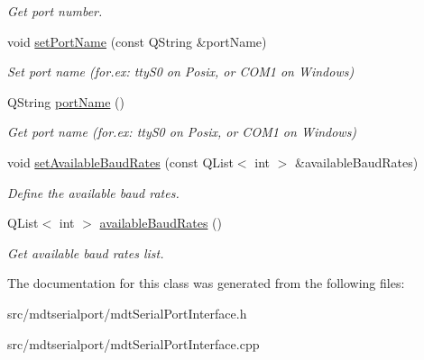 \begin{DoxyCompactItemize}
\begin{DoxyCompactList}\small\item\em Get port number. \end{DoxyCompactList}\item 
\hypertarget{classmdt_serial_port_interface_a09153f63415acdccceac1c212486b92e}{
void \hyperlink{classmdt_serial_port_interface_a09153f63415acdccceac1c212486b92e}{setPortName} (const QString \&portName)}
\label{classmdt_serial_port_interface_a09153f63415acdccceac1c212486b92e}

\begin{DoxyCompactList}\small\item\em Set port name (for.ex: ttyS0 on Posix, or COM1 on Windows) \end{DoxyCompactList}\item 
\hypertarget{classmdt_serial_port_interface_ab09ac4bac0de767291fdbdc6c3ff0ca8}{
QString \hyperlink{classmdt_serial_port_interface_ab09ac4bac0de767291fdbdc6c3ff0ca8}{portName} ()}
\label{classmdt_serial_port_interface_ab09ac4bac0de767291fdbdc6c3ff0ca8}

\begin{DoxyCompactList}\small\item\em Get port name (for.ex: ttyS0 on Posix, or COM1 on Windows) \end{DoxyCompactList}\item 
\hypertarget{classmdt_serial_port_interface_a6ca559d02fe871ec354e6ef6af2a6e03}{
void \hyperlink{classmdt_serial_port_interface_a6ca559d02fe871ec354e6ef6af2a6e03}{setAvailableBaudRates} (const QList$<$ int $>$ \&availableBaudRates)}
\label{classmdt_serial_port_interface_a6ca559d02fe871ec354e6ef6af2a6e03}

\begin{DoxyCompactList}\small\item\em Define the available baud rates. \end{DoxyCompactList}\item 
\hypertarget{classmdt_serial_port_interface_ab4f93655abb9aaa12e24bb6db6c99d96}{
QList$<$ int $>$ \hyperlink{classmdt_serial_port_interface_ab4f93655abb9aaa12e24bb6db6c99d96}{availableBaudRates} ()}
\label{classmdt_serial_port_interface_ab4f93655abb9aaa12e24bb6db6c99d96}

\begin{DoxyCompactList}\small\item\em Get available baud rates list. \end{DoxyCompactList}\end{DoxyCompactItemize}


The documentation for this class was generated from the following files:\begin{DoxyCompactItemize}
\item 
src/mdtserialport/mdtSerialPortInterface.h\item 
src/mdtserialport/mdtSerialPortInterface.cpp\end{DoxyCompactItemize}
